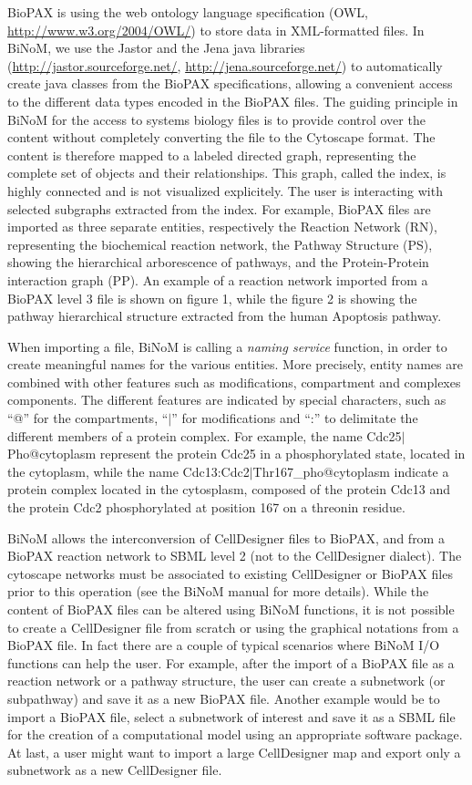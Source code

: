 \documentclass[10pt]{bmc_article}
\newenvironment{bmcformat}{\baselineskip20pt\sloppy\setboolean{publ}{false}}{\baselineskip20pt\sloppy}
\begin{document}
\begin{bmcformat}
BioPAX is using the web ontology language specification (OWL,
\url{http://www.w3.org/2004/OWL/}) to store data in XML-formatted files. In
BiNoM, we use the Jastor and the Jena java libraries
(\url{http://jastor.sourceforge.net/}, \url{http://jena.sourceforge.net/}) to
automatically create java classes from the BioPAX specifications, allowing a
convenient access to the different data types encoded in the BioPAX files. The
guiding principle in BiNoM for the
access to systems biology files is to provide control over the content without
completely converting the file to the Cytoscape format. The content is therefore
mapped to a labeled directed graph, representing the complete set of objects and
their relationships. This graph, called the index, is highly connected and is
not visualized explicitely. The user is interacting with selected subgraphs
extracted from the index. For example, BioPAX files are imported as three
separate entities, respectively the Reaction Network (RN), representing the
biochemical reaction network, the Pathway Structure (PS), showing the
hierarchical arborescence of pathways, and the Protein-Protein interaction graph
(PP). An example of a reaction network imported from a BioPAX level 3 file is
shown on figure 1, while the figure 2 is showing the pathway hierarchical
structure extracted from the human Apoptosis pathway.  

When importing a file, BiNoM is calling a \emph{naming service} function, in
order to create meaningful names for the various entities. More precisely,
entity names are combined with other features such as modifications, compartment
and complexes components. The different features are indicated by special
characters, such as ``@'' for the compartments, ``$|$'' for modifications and
``:'' to delimitate the different members of a protein complex. For example, the
name Cdc25$|$Pho@cytoplasm represent the protein Cdc25 in a phosphorylated
state, located in the cytoplasm, while the name
Cdc13:Cdc2$|$Thr167\_pho@cytoplasm indicate a protein complex located in the
cytosplasm, composed of the protein Cdc13 and the protein Cdc2 phosphorylated at
position 167 on a threonin residue.

BiNoM allows the interconversion of CellDesigner files to BioPAX, and from a BioPAX
reaction network to SBML level 2 (not to the CellDesigner dialect). The
cytoscape networks must be associated to existing CellDesigner or BioPAX files
prior to this operation (see the BiNoM manual for more details). While the
content of BioPAX files can be altered using BiNoM functions, it is not possible
to create a CellDesigner file from scratch or using the graphical notations from
a BioPAX file. In fact there are a couple of typical scenarios where BiNoM I/O
functions can help the user. For example, after the import of a BioPAX file as a
reaction network or a pathway structure, the user can create a subnetwork (or
subpathway) and save it as a new BioPAX file. Another example would be to import
a BioPAX file, select a subnetwork of interest and save it as a SBML file for
the creation of a computational model using an appropriate software package.
At last, a user might want to import a large CellDesigner map and export only a
subnetwork as a new CellDesigner file.  



\end{bmcformat}
\end{document}
